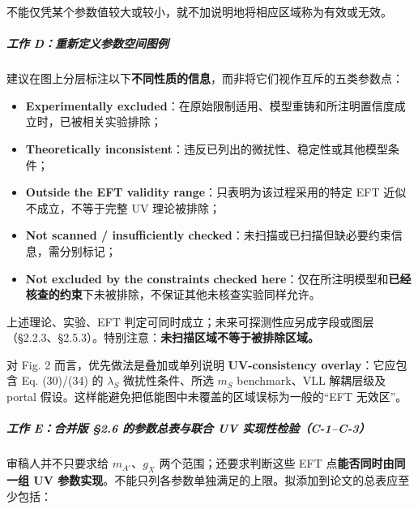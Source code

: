 \documentclass[
]{article}
\providecommand{\tightlist}{%
  \setlength{\itemsep}{0pt}\setlength{\parskip}{0pt}}
\begin{document}
不能仅凭某个参数值较大或较小，就不加说明地将相应区域称为有效或无效。

\subparagraph{工作
D：重新定义参数空间图例}\label{ux5de5ux4f5c-dux91cdux65b0ux5b9aux4e49ux53c2ux6570ux7a7aux95f4ux56feux4f8b}

建议在图上分层标注以下\textbf{不同性质的信息}，而非将它们视作互斥的五类参数点：

\begin{itemize}
\tightlist
\item
  \textbf{Experimentally
  excluded}：在原始限制适用、模型重铸和所注明置信度成立时，已被相关实验排除；
\item
  \textbf{Theoretically
  inconsistent}：违反已列出的微扰性、稳定性或其他模型条件；
\item
  \textbf{Outside the EFT validity range}：只表明为该过程采用的特定 EFT
  近似不成立，不等于完整 UV 理论被排除；
\item
  \textbf{Not scanned / insufficiently
  checked}：未扫描或已扫描但缺必要约束信息，需分别标记；
\item
  \textbf{Not excluded by the constraints checked
  here}：仅在所注明模型和\textbf{已经核查的约束}下未被排除，不保证其他未核查实验同样允许。
\end{itemize}

上述理论、实验、EFT
判定可同时成立；未来可探测性应另成字段或图层（§2.2.3、§2.5.3）。特别注意：\textbf{未扫描区域不等于被排除区域。}

对 Fig. 2 而言，优先做法是叠加或单列说明 \textbf{UV-consistency
overlay}：它应包含 Eq. (30)/(34) 的 \(\lambda_S\) 微扰性条件、所选
\(m_S\) benchmark、VLL 解耦层级及 portal
假设。这样能避免把低能图中未覆盖的区域误标为一般的``EFT 无效区''。

\subparagraph{工作 E：合并版 §2.6 的参数总表与联合 UV
实现性检验（C-1--C-3）}\label{ux5de5ux4f5c-eux5408ux5e76ux7248-2.6-ux7684ux53c2ux6570ux603bux8868ux4e0eux8054ux5408-uv-ux5b9eux73b0ux6027ux68c0ux9a8cc-1c-3}

审稿人并不只要求给 \(m_{A'}\)、\(g_X\) 两个范围；还要求判断这些 EFT
点\textbf{能否同时由同一组 UV
参数实现}。不能只列各参数单独满足的上限。拟添加到论文的总表应至少包括：
\end{document}
